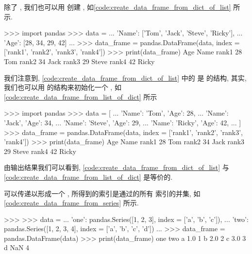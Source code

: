 除了 , 我们也可以用  创建 , 如\cref{code:create_data_frame_from_dict_of_list} 所示.%
%
\begin{codebox}[
  label = code:create_data_frame_from_dict_of_list,
  caption = 利用 \inlinetext{dict} 创建 \inlinetext{DataFrame},
]
>>> import pandas
>>> data = {
...     'Name': ['Tom', 'Jack', 'Steve', 'Ricky'],
...     'Age':  [28,    34,     29,      42]
... }
>>> data_frame = pandas.DataFrame(data, index = ['rank1', 'rank2', 'rank3', 'rank4'])
>>> print(data_frame)
       Age   Name
rank1   28    Tom
rank2   34   Jack
rank3   29  Steve
rank4   42  Ricky
\end{codebox}%
%
我们注意到, \cref{code:create_data_frame_from_dict_of_list} 中的  是  的结构, 其实, 我们也可以用  的结构来初始化一个 , 如\cref{code:create_data_frame_from_list_of_dict} 所示
\begin{codebox}[
  label = code:create_data_frame_from_list_of_dict,
  caption = 利用 \inlinetext{dict} 创建 \inlinetext{DataFrame},
]
>>> import pandas
>>> data = [
...     {'Name': 'Tom',   'Age': 28},
...     {'Name': 'Jack',  'Age': 34},
...     {'Name': 'Steve', 'Age': 29},
...     {'Name': 'Ricky', 'Age': 42},
... ]
>>> data_frame = pandas.DataFrame(data, index = ['rank1', 'rank2', 'rank3', 'rank4'])
>>> print(data_frame)
       Age   Name
rank1   28    Tom
rank2   34   Jack
rank3   29  Steve
rank4   42  Ricky
\end{codebox}%
%
由输出结果我们可以看到, \cref{code:create_data_frame_from_dict_of_list} 与\cref{code:create_data_frame_from_list_of_dict} 是等价的.

 可以传递以形成一个 , 所得到的索引是通过的所有  索引的并集, 如\cref{code:create_data_frame_from_series} 所示.%
%
\begin{codebox}[
  label = code:create_data_frame_from_series,
  caption = 利用 \inlinetext{pandas.Series} 创建 \inlinetext{DataFrame},
]
>>>
>>> data = {
...     'one': pandas.Series([1, 2, 3],    index = ['a', 'b', 'c']),
...     'two': pandas.Series([1, 2, 3, 4], index = ['a', 'b', 'c', 'd'])
... }
>>> data_frame = pandas.DataFrame(data)
>>> print(data_frame)
   one  two
a  1.0    1
b  2.0    2
c  3.0    3
d  NaN    4
\end{codebox}

